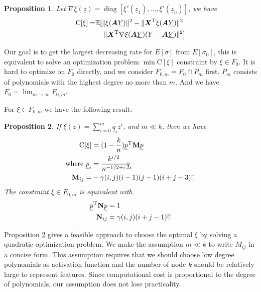\documentclass[conference]{IEEEtran}
\newtheorem{proposition}{Proposition}
\DeclarePairedDelimiter\norm{\lVert}{\rVert}
\def\E{\mathbb{E}}
\def\T{\mathrm{T}}
\DeclareMathOperator*{\diag}{diag}
\newcommand{\ide}[2]{ \gamma(#1,#2) }
\begin{document}
\begin{proposition}\label{prop:Esigma} 
Let $\nabla \xi(\underline{z})  = \diag[\xi'(\underline{z}_1), \dots, \xi'(\underline{z}_n)]$, we have
\begin{align}\notag
\mathrm{C}[\xi]= & \E[\norm{\xi(\bm{A}\underline{Y})}^2 -
\norm{\bm{X}^\T\xi(\bm{A}\underline{Y})}^2 \\
&- \norm{\bm{X}^\T \nabla\xi(\bm{A}\underline{Y})(Y-\bm{A}\underline{Y})}^2]
\end{align}
\end{proposition}

Our goal is to get the largest decreasing rate for $E[\sigma]$ from $E[\sigma_0]$, this is equivalent to solve an optimization problem $\min \mathrm{C}[\xi]$ constraint by $\xi \in F_0$. It is hard to optimize on $F_0$ directly, and we consider $F_{0,m} = F_0 \cap P_m$ first. $P_m$ consists of polynomials with the highest degree no more than $m$. And we have $F_0 = \lim_{m\to \infty} F_{0,m}$.

For $\xi \in F_{0,m}$ we have the following result:
\begin{proposition}\label{prop:quadratic}
If
$\xi(z) = \sum_{i=0}^m \underline{q}_i z^i$,
and $m \ll k$, then we have 
\begin{align}
\mathrm{C}[\xi] &= (1-\frac{k}{n}) \underline{p}^\T \mathbf{M} \underline{p} \notag\\
\textrm{where }\underline{p}_i &= \frac{k^{i/2}}{n^{- 1/2 + i}}\underline{q}_i\label{eq:pqt} \\
\mathbf{M}_{ij} =& -\ide{i}{j}(i-1)(j-1)(i+j-3)!! \notag
\end{align}
The constraint $\xi \in F_{0,m}$ is equivalent with
\begin{align}
\underline{p}^\T \mathbf{N} \underline{p} & = 1 \notag\\
\mathbf{N}_{ij}  & = \ide{i}{j}(i+j-1)!!
\end{align}
\end{proposition}

Proposition \ref{prop:quadratic} gives a feasible approach to choose the optimal $\xi$ by solving a quadratic optimization problem. We make the assumption $
m \ll k$ to write $M_{ij}$ in a concise form. This assumption requires that we should choose low degree polynomials as activation function and the number of node $k$ should be relatively large to represent features. Since computational cost
is proportional to the degree of polynomials, our assumption does not lose practicality. 
\end{document}
